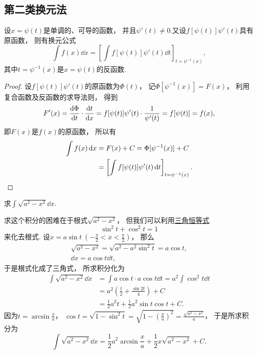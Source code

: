 \subsection{第二类换元法}
\begin{theorem}
设\(x = \psi(t)\)是单调的、可导的函数，
并且\(\psi'(t) \neq 0\).又设\(f[\psi(t)] \psi'(t)\)具有原函数，
则有换元公式\begin{equation*}
	\int f(x) \dd{x}
	= \left[ \int f[\psi(t)] \psi'(t) \dd{t} \right]_{t=\psi^{-1}(x)},
\end{equation*}
其中\(t=\psi^{-1}(x)\)是\(x=\psi(t)\)的反函数.
\begin{proof}
设\(f[\psi(t)] \psi'(t)\)的原函数为\(\Phi(t)\)，
记\(\Phi[\psi^{-1}(x)] = F(x)\)，
利用复合函数及反函数的求导法则，
得到\begin{equation*}
	F'(x) = \dv{\Phi}{t} \cdot \dv{t}{x}
	= f[\psi(t)] \psi'(t) \cdot \frac{1}{\psi'(t)}
	= f[\psi(t)] = f(x),
\end{equation*}
即\(F(x)\)是\(f(x)\)的原函数，
所以有\begin{align*}
	\int f(x) \dd{x} &= F(x) + C
	= \Phi[\psi^{-1}(x)] + C \\
	&= \left[ \int f[\psi(t)] \psi'(t) \dd{t} \right]_{t=\psi^{-1}(x)}.
	\qedhere
\end{align*}
\end{proof}
\end{theorem}

\begin{example}
求\(\int \sqrt{a^2 - x^2} \dd{x}\).
\begin{solution}
求这个积分的困难在于根式\(\sqrt{a^2-x^2}\)，
但我们可以利用\hyperref[equation:三角函数.毕达哥拉斯三角恒等式1]{三角恒等式}\begin{equation*}
	\sin^2 t + \cos^2 t = 1
\end{equation*}来化去根式.
设\(x = a \sin t\ (-\frac\pi2 < x < \frac\pi2)\)，
那么\begin{gather*}
	\sqrt{a^2 - x^2}
	= \sqrt{a^2 - a^2 \sin^2 t}
	= a \cos t, \\
	\dd{x}
	= a \cos t \dd{t},
\end{gather*}
于是根式化成了三角式，
所求积分化为\begin{align*}
	\int \sqrt{a^2 - x^2} \dd{x}
	&= \int a \cos t \cdot a \cos t \dd{t}
	= a^2 \int \cos^2 t \dd{t} \\
	&= a^2 \left( \frac{t}{2} + \frac{\sin 2t}{4} \right) + C \\
	&= \frac{1}{2} a^2 t + \frac{1}{2} a^2 \sin t \cos t + C.
\end{align*}
因为\(t = \arcsin\frac{x}{a}\)，
\(\cos t
= \sqrt{1-\sin^2 t}
= \sqrt{1-\left(\frac{x}{a}\right)^2}
= \frac{\sqrt{a^2-x^2}}{a}\)，
于是所求积分为\begin{equation*}
	\int \sqrt{a^2 - x^2} \dd{x}
	= \frac{1}{2} a^2 \arcsin\frac{x}{a} + \frac{1}{2} x \sqrt{a^2 - x^2} + C.
\end{equation*}
\end{solution}
\end{example}

